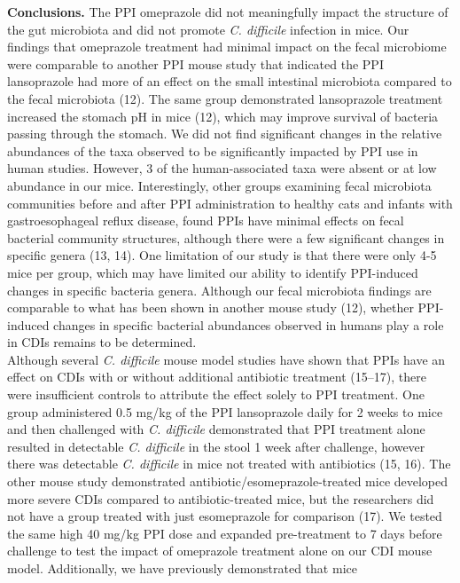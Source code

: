 \documentclass[11pt,]{article}
\begin{document}
\textbf{Conclusions.} The PPI omeprazole did not meaningfully impact the
structure of the gut microbiota and did not promote \emph{C. difficile}
infection in mice. Our findings that omeprazole treatment had minimal
impact on the fecal microbiome were comparable to another PPI mouse
study that indicated the PPI lansoprazole had more of an effect on the
small intestinal microbiota compared to the fecal microbiota (12). The
same group demonstrated lansoprazole treatment increased the stomach pH
in mice (12), which may improve survival of bacteria passing through the
stomach. We did not find significant changes in the relative abundances
of the taxa observed to be significantly impacted by PPI use in human
studies. However, 3 of the human-associated taxa were absent or at low
abundance in our mice. Interestingly, other groups examining fecal
microbiota communities before and after PPI administration to healthy
cats and infants with gastroesophageal reflux disease, found PPIs have
minimal effects on fecal bacterial community structures, although there
were a few significant changes in specific genera (13, 14). One
limitation of our study is that there were only 4-5 mice per group,
which may have limited our ability to identify PPI-induced changes in
specific bacteria genera. Although our fecal microbiota findings are
comparable to what has been shown in another mouse study (12), whether
PPI-induced changes in specific bacterial abundances observed in humans
play a role in CDIs remains to be determined.\\
Although several \emph{C. difficile} mouse model studies have shown that
PPIs have an effect on CDIs with or without additional antibiotic
treatment (15--17), there were insufficient controls to attribute the
effect solely to PPI treatment. One group administered 0.5 mg/kg of the
PPI lansoprazole daily for 2 weeks to mice and then challenged with
\emph{C. difficile} demonstrated that PPI treatment alone resulted in
detectable \emph{C. difficile} in the stool 1 week after challenge,
however there was detectable \emph{C. difficile} in mice not treated
with antibiotics (15, 16). The other mouse study demonstrated
antibiotic/esomeprazole-treated mice developed more severe CDIs compared
to antibiotic-treated mice, but the researchers did not have a group
treated with just esomeprazole for comparison (17). We tested the same
high 40 mg/kg PPI dose and expanded pre-treatment to 7 days before
challenge to test the impact of omeprazole treatment alone on our CDI
mouse model. Additionally, we have previously demonstrated that mice
\end{document}
